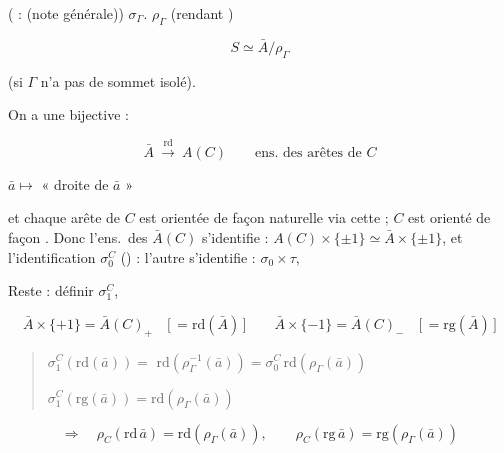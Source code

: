 \documentclass[11pt,a4paper]{article}
\begin{document}
\struck{\ill{}}  \ill{} 
\ill{} (\ill{} : (note générale)) \ill{}  \ill{}
 $\sigma_\Gamma$. \ill{} 
$\rho_\Gamma$ (rendant \ill{}) \ill{}  \ill{}
 \ill{}

\[
S \simeq \bar A / \rho_\Gamma
\]

(si $\Gamma$ n'a pas de sommet isolé).


On a une  bijective :

\[
\bar A \ \xrightarrow{\ \mathrm{rd}\ }\ A(C) \qquad \text{ens.\ des arêtes de } C
\]

$\bar a \longmapsto$ «   droite de
$\bar a$ »


et chaque arête de $C$ est orientée de façon naturelle via cette
\struck{\ill{}} ; $C$ est orienté de façon \ill{}. Donc l'ens.\ des \ill{}
$\bar A(C)$ s'identifie : $A(C) \times \{\pm 1\} \simeq \bar A \times \{\pm 1\}$,
et l'identification $\sigma_0^C$ (\ill{}) : l'autre \struck{\ill{}}
s'identifie : \struck{\ill{}} $\sigma_0 \times \tau$, \ill{}

Reste : définir $\sigma_1^C$, \ill{}

\[
\bar A \times \{+1\} = \bar A(C)_+ \quad \bigl[\, = \mathrm{rd}(\bar A)\,\bigr]
\qquad
\bar A \times \{-1\} = \bar A(C)_- \quad \bigl[\, = \mathrm{rg}(\bar A)\,\bigr]
\]


\begin{quote}
$\sigma_1^C(\mathrm{rd}(\bar a)) =$ \struck{\ill{}} $\mathrm{rd}(\rho_\Gamma^{-1}(\bar a)) = \sigma_0^C\,\mathrm{rd}(\rho_\Gamma(\bar a))$

$\sigma_1^C(\mathrm{rg}(\bar a)) = \mathrm{rd}(\rho_\Gamma(\bar a))$ \struck{\ill{}}
\end{quote}

\[
\Longrightarrow \quad
\rho_C(\mathrm{rd}\,\bar a) = \mathrm{rd}(\rho_\Gamma(\bar a)), \qquad
\rho_C(\mathrm{rg}\,\bar a) = \mathrm{rg}(\rho_\Gamma(\bar a))
\]

\end{document}
